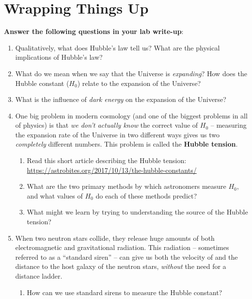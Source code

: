 \documentclass[11pt]{article}
\begin{document}
\section{Wrapping Things Up}
\textbf{Answer the following questions in your lab write-up}:
\begin{enumerate}[resume]

    \item Qualitatively, what does Hubble's law tell us? What are the physical implications of Hubble's law?
    
    \item What do we mean when we say that the Universe is \emph{expanding}? How does the Hubble constant ($H_0$) relate to the expansion of the Universe?
    
    \item What is the influence of \emph{dark energy} on the expansion of the Universe?

    \item One big problem in modern cosmology (and one of the biggest problems in all of physics) is that \emph{we don't actually know} the correct value of $H_0$ -- measuring the expansion rate of the Universe in two different ways gives us two \emph{completely} different numbers. This problem is called the \textbf{Hubble tension}.
    \begin{enumerate}
        \item Read this short article describing the Hubble tension: \url{https://astrobites.org/2017/10/13/the-hubble-constants/}
        
        \item What are the two primary methods by which astronomers measure $H_0$, and what values of $H_0$ do each of these methods predict?
        
        \item What might we learn by trying to understanding the source of the Hubble tension?
    \end{enumerate}
    
    \item When two neutron stars collide, they release huge amounts of both electromagnetic and gravitational radiation. This radiation -- sometimes referred to as a ``standard siren'' -- can give us both the velocity of and the distance to the host galaxy of the neutron stars, \emph{without} the need for a distance ladder.
    \begin{enumerate}
        \item How can we use standard sirens to measure the Hubble constant?
        

\end{enumerate}
\end{enumerate}
\end{document}
